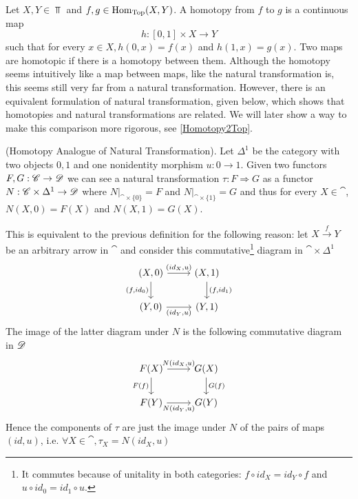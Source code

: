 \begin{ex}
\begin{enumerate}
    \label{Homotopy}
        Let $X,Y\in \Top$ and $f,g\in \operatorname{Hom}_{\operatorname{Top}}(X,Y)$. A homotopy from $f$ to $g$ is a continuous map 
        $$h:[0,1]\times X\to Y$$ 
        such that for every $x\in X, h(0,x)=f(x)$ and $h(1,x)=g(x)$. Two maps are homotopic if there is a homotopy between them. 
        Although the homotopy seems intuitively like a map between maps, like the natural transformation is, this seems still very far from a natural transformation. However, there is an equivalent formulation of natural transformation, given below, which shows that homotopies and natural transformations are related. We will later show a way to make this comparison more rigorous, see \ref{Homotopy2Top}. 
\end{enumerate}
\end{ex}

\begin{defn}\extra\textmd{(Homotopy Analogue of Natural Transformation).}
    Let $\Delta^{1}$ be the category with two objects $0,1$ and one nonidentity morphism $u:0\to1$. Given two functors $F,G:\mathscr{C}\to\mathscr{D}$ we can see a natural transformation $\tau:F\Rightarrow G$ as a functor $N:\mathscr{C}\times\Delta^{1}\to\mathscr{D}$ where $N|_{\cat\times\{0\}}=F$ and $N|_{\cat\times\{1\}}=G$ and thus for every $X\in\cat$, $N(X,0)=F(X)$ and $N(X,1)=G(X)$. 
\end{defn}
\noindent This is equivalent to the previous definition for the following reason: let $X\xrightarrow{f} Y$ be an arbitrary arrow in $\cat$ and consider this commutative\footnote{It commutes because of unitality in both categories: $f\circ id_X=id_Y\circ f$ and $u\circ id_0=id_1\circ u$.} diagram in $\cat\times\Delta^1$
\[\begin{tikzcd}
    {(X,0)} & {(X,1)} \\
    {(Y,0)} & {(Y,1)}
    \arrow["{(id_X,u)}", from=1-1, to=1-2]
    \arrow["{(f,id_0)}"', from=1-1, to=2-1]
    \arrow["{(f,id_1)}", from=1-2, to=2-2]
    \arrow["{(id_Y,u)}"', from=2-1, to=2-2]
\end{tikzcd}\]
The image of the latter diagram under $N$ is the following commutative diagram in $\mathscr{D}$
\[\begin{tikzcd}
    {F(X)} & {G(X)} \\
    {F(Y)} & {G(Y)} 
    \arrow["{N(id_X,u)}", from=1-1, to=1-2]
    \arrow["{F(f)}"', from=1-1, to=2-1]
    \arrow["{G(f)}", from=1-2, to=2-2]
    \arrow["{N(id_Y,u)}"', from=2-1, to=2-2]
\end{tikzcd}\]
Hence the components of $\tau$ are just the image under $N$ of the pairs of maps $(id,u)$, i.e. $\forall X\in\cat, \tau_X=N(id_X,u)$